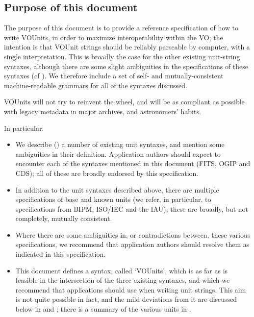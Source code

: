 \documentclass[11pt,notitlepage,onecolumn]{ivoa}
\begin{document}


\subsection{Purpose of this document}
\label{sec:purpose}

The purpose of this document is to provide a reference specification of how
to write VOUnits, in order to maximize interoperability within the VO;
the intention is that VOUnit strings should be reliably
parseable by computer, with a single interpretation.
This is broadly the case for the other existing
unit-string syntaxes, although there are some slight ambiguities in
the specifications of these syntaxes (cf ).
We therefore include a set of self- and mutually-consistent
machine-readable grammars for all of the syntaxes discussed.

VOUnits will not try to reinvent the wheel, and will be as compliant as possible with
legacy metadata in major archives, and astronomers' habits.

In particular:
\begin{itemize}
\item We describe () a number of existing unit
  syntaxes, and mention some ambiguities in their
  definition. Application authors should expect to encounter each of
  the syntaxes mentioned in this document (FITS, OGIP and CDS); all of
  these are broadly endorsed by this specification.
\item In addition to the unit syntaxes described above, there are
  multiple specifications of base and known units
  (we refer, in particular, to 
  specifications from BIPM, ISO/IEC and the IAU);
  these are broadly, but not completely, mutually consistent.
\item Where there are some ambiguities in, or contradictions between,
  these various specifications, we recommend that application authors should
  resolve them as indicated in this specification.  
\item This document defines a syntax, called `VOUnits', which is as
  far as is feasible in the intersection of the three existing syntaxes, and
  which we recommend that applications should use when writing unit
  strings.  This aim is not quite
  possible in fact, and the mild deviations from it are discussed
  below in  and ;
  there is a summary of the various units in .
\end{itemize}
\end{document}
